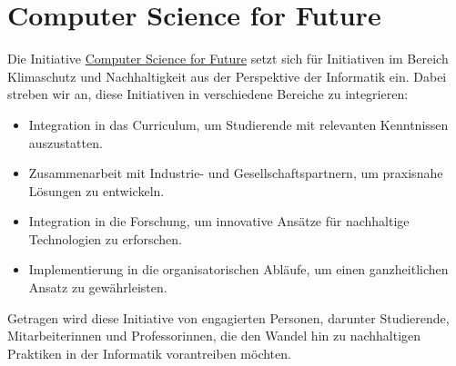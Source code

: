 \documentclass{article}
\begin{document}
\section{Computer Science for Future}

Die Initiative \href{https://www.haw-hamburg.de/hochschule/technik-und-informatik/departments/informatik/unser-department/computer-science-for-future/}{\glqq Computer Science for Future\grqq} setzt sich für Initiativen im Bereich Klimaschutz und Nachhaltigkeit aus der Perspektive der Informatik ein. Dabei streben wir an, diese Initiativen in verschiedene Bereiche zu integrieren:

\begin{itemize}
	\item Integration in das Curriculum, um Studierende mit relevanten Kenntnissen auszustatten.
	\item Zusammenarbeit mit Industrie- und Gesellschaftspartnern, um praxisnahe Lösungen zu entwickeln.
	\item Integration in die Forschung, um innovative Ansätze für nachhaltige Technologien zu erforschen.
	\item Implementierung in die organisatorischen Abläufe, um einen ganzheitlichen Ansatz zu gewährleisten.
\end{itemize}
Getragen wird diese Initiative von engagierten Personen, darunter Studierende, Mitarbeiterinnen und Professorinnen, die den Wandel hin zu nachhaltigen Praktiken in der Informatik vorantreiben möchten.
\end{document}
